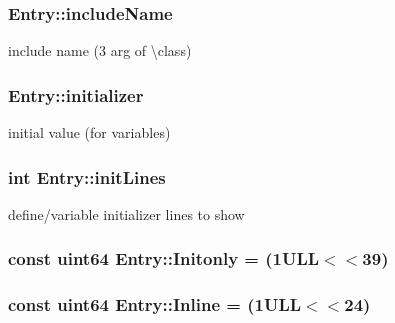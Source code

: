 \subsubsection[{include\+Name}]{ Entry\+::include\+Name}\label{class_entry_a32626ce14eb253f6da64ed475419a4ac}


include name (3 arg of \textbackslash{}class) 

\hypertarget{class_entry_a2a0c9e7ce364ed2981f49314c33245f9}{}
\subsubsection[{initializer}]{ Entry\+::initializer}\label{class_entry_a2a0c9e7ce364ed2981f49314c33245f9}


initial value (for variables) 

\hypertarget{class_entry_ae283a992b9a74c6925c6f602ba7d830d}{}
\subsubsection[{init\+Lines}]{\setlength{\rightskip}{0pt plus 5cm}int Entry\+::init\+Lines}\label{class_entry_ae283a992b9a74c6925c6f602ba7d830d}


define/variable initializer lines to show 

\hypertarget{class_entry_a08eec02f87c0ace9463450d8d385e6c5}{}
\subsubsection[{Initonly}]{\setlength{\rightskip}{0pt plus 5cm}const {\bf uint64} Entry\+::\+Initonly = (1\+U\+L\+L$<$$<$39)\hspace{0.3cm}{\ttfamily [static]}}\label{class_entry_a08eec02f87c0ace9463450d8d385e6c5}
\hypertarget{class_entry_af6ecc88758dbf70b8ac46f1653084fba}{}
\subsubsection[{Inline}]{\setlength{\rightskip}{0pt plus 5cm}const {\bf uint64} Entry\+::\+Inline = (1\+U\+L\+L$<$$<$24)\hspace{0.3cm}{\ttfamily [static]}}\label{class_entry_af6ecc88758dbf70b8ac46f1653084fba}
\hypertarget{class_entry_af88583a31bcd3cfc5aa52691f958833f}{}
